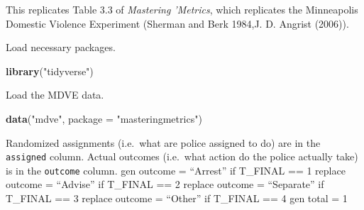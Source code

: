 \documentclass[]{book}
\newenvironment{Shaded}{\begin{snugshade}}{\end{snugshade}}
\newcommand{\KeywordTok}[1]{\textcolor[rgb]{0.13,0.29,0.53}{\textbf{#1}}}
\newcommand{\DataTypeTok}[1]{\textcolor[rgb]{0.13,0.29,0.53}{#1}}
\newcommand{\DecValTok}[1]{\textcolor[rgb]{0.00,0.00,0.81}{#1}}
\newcommand{\StringTok}[1]{\textcolor[rgb]{0.31,0.60,0.02}{#1}}
\newcommand{\OperatorTok}[1]{\textcolor[rgb]{0.81,0.36,0.00}{\textbf{#1}}}
\newcommand{\NormalTok}[1]{#1}
\theoremstyle{definition}
\theoremstyle{definition}
\theoremstyle{definition}
\theoremstyle{remark}
\begin{document}
This replicates Table 3.3 of \emph{Mastering 'Metrics}, which replicates
the Minneapolis Domestic Violence Experiment (Sherman and Berk 1984,J.
D. Angrist (2006)).

Load necessary packages.

\begin{Shaded}
\begin{Highlighting}[]
\KeywordTok{library}\NormalTok{(}\StringTok{"tidyverse"}\NormalTok{)}
\end{Highlighting}
\end{Shaded}

Load the MDVE data.

\begin{Shaded}
\begin{Highlighting}[]
\KeywordTok{data}\NormalTok{(}\StringTok{"mdve"}\NormalTok{, }\DataTypeTok{package =} \StringTok{"masteringmetrics"}\NormalTok{)}
\end{Highlighting}
\end{Shaded}

Randomized assignments (i.e.~what are police assigned to do) are in the
\texttt{assigned} column. Actual outcomes (i.e.~what action do the
police actually take) is in the \texttt{outcome} column. gen outcome =
``Arrest'' if T\_FINAL == 1 replace outcome = ``Advise'' if T\_FINAL ==
2 replace outcome = ``Separate'' if T\_FINAL == 3 replace outcome =
``Other'' if T\_FINAL == 4 gen total = 1

\begin{Shaded}
\end{Shaded}
\end{document}

